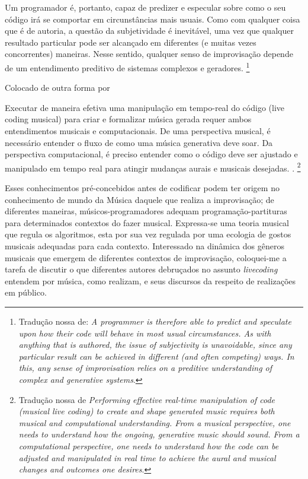 \begin{citacao}
Um programador é, portanto, capaz de predizer e especular sobre como o seu código irá se comportar em circunstâncias mais usuais. Como com qualquer coisa que é de autoria, a questão da subjetividade é inevitável, uma vez que qualquer resultado particular pode ser alcançado em diferentes (e muitas vezes concorrentes) maneiras. Nesse sentido, qualquer senso de improvisação depende de um entendimento preditivo de sistemas complexos e geradores. \cite[p.~169]{cox_coding_2004}\footnote{Tradução nossa de: \emph{A programmer is therefore able to predict and speculate upon how their code will behave in most usual circumstances. As with anything that is authored, the issue of subjectivity is unavoidable, since any particular result can be achieved in different (and often competing) ways. In this, any sense of improvisation relies on a preditive understanding of complex and generative systems}.} 
\end{citacao}

Colocado de outra forma por 

\begin{citacao}
Executar de maneira efetiva uma manipulação em tempo-real do código (live coding musical) para criar e formalizar música gerada requer ambos entendimentos musicais e computacionais. De uma perspectiva musical, é necessário entender o fluxo de como uma música generativa deve soar. Da perspectiva computacional, é preciso entender como o código deve ser ajustado e manipulado em tempo real para atingir mudanças aurais e musicais desejadas. \cite[p.~3-4]{ruthmann_teaching_2010}. \footnote{Tradução nossa de \emph{Performing effective real-time manipulation of code (musical live coding) to create and shape generated music requires both musical and computational understanding. From a musical perspective, one needs to understand how the ongoing, generative music should sound. From a computational perspective, one needs to understand how the code can be adjusted and manipulated in real time to achieve the aural and musical changes and outcomes one desires}.}
\end{citacao}

Esses conhecimentos pré-concebidos antes de codificar podem ter origem no conhecimento de mundo da Música daquele que realiza a improvisação; de diferentes maneiras, músicos-programadores adequam programação-partituras para determinados contextos do fazer musical. Expressa-se uma teoria musical que regula os algoritmos, esta por sua vez regulada por uma ecologia de gostos musicais adequadas para cada contexto. Interessado na dinâmica dos gêneros musicais que emergem de diferentes contextos de improvisação, coloquei-me a tarefa de discutir o que diferentes autores debruçados no assunto \emph{livecoding} entendem por música, como realizam, e seus discursos da respeito de realizações em público. 

